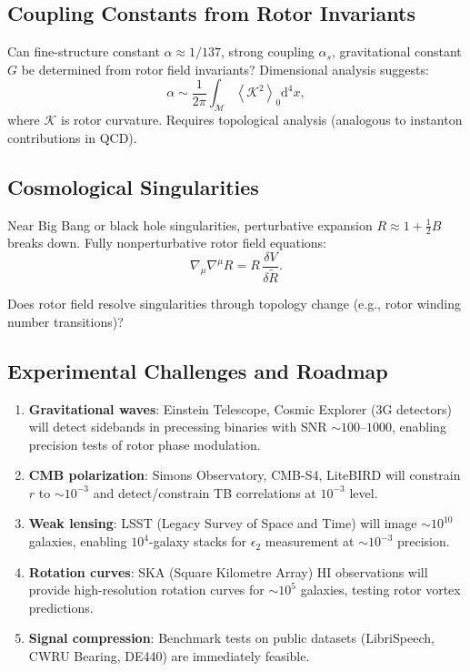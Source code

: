 \documentclass[11pt,a4paper]{article}
\numberwithin{equation}{section}
\theoremstyle{plain}
\theoremstyle{definition}
\theoremstyle{remark}
\newcommand{\grade}[2]{\left\langle #1 \right\rangle_{#2}}
\newcommand{\scal}[1]{\grade{#1}{0}}       %
\newcommand{\rev}[1]{\widetilde{#1}}       %
\newcommand{\dd}{\mathrm{d}}
\begin{document}
\subsection{Coupling Constants from Rotor Invariants}

Can fine-structure constant $\alpha \approx 1/137$, strong coupling $\alpha_s$, gravitational constant $G$ be determined from rotor field invariants? Dimensional analysis suggests:
\begin{equation}
\alpha \sim \frac{1}{2\pi}\int_{\mathcal{M}} \scal{\mathcal{K}^2}\dd^4x,
\end{equation}
where $\mathcal{K}$ is rotor curvature. Requires topological analysis (analogous to instanton contributions in QCD).

\subsection{Cosmological Singularities}

Near Big Bang or black hole singularities, perturbative expansion $R \approx 1 + \frac{1}{2}B$ breaks down. Fully nonperturbative rotor field equations:
\begin{equation}
\nabla_\mu\nabla^\mu R = R\,\frac{\delta V}{\delta\rev{R}}.
\end{equation}

Does rotor field resolve singularities through topology change (e.g., rotor winding number transitions)?

\subsection{Experimental Challenges and Roadmap}

\begin{enumerate}
\item \textbf{Gravitational waves}: Einstein Telescope, Cosmic Explorer (3G detectors) will detect sidebands in precessing binaries with SNR $\sim 100$–$1000$, enabling precision tests of rotor phase modulation.

\item \textbf{CMB polarization}: Simons Observatory, CMB-S4, LiteBIRD will constrain $r$ to $\sim 10^{-3}$ and detect/constrain TB correlations at $10^{-3}$ level.

\item \textbf{Weak lensing}: LSST (Legacy Survey of Space and Time) will image $\sim 10^{10}$ galaxies, enabling $10^4$-galaxy stacks for $\epsilon_2$ measurement at $\sim 10^{-3}$ precision.

\item \textbf{Rotation curves}: SKA (Square Kilometre Array) HI observations will provide high-resolution rotation curves for $\sim 10^5$ galaxies, testing rotor vortex predictions.

\item \textbf{Signal compression}: Benchmark tests on public datasets (LibriSpeech, CWRU Bearing, DE440) are immediately feasible.
\end{enumerate}
\end{document}
